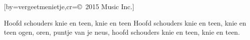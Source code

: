  

[by=vergeetmenietje,cr={\copyright~2015 Music Inc.}]




\beginverse
    Hoofd schouders knie en teen, knie en teen 
    Hoofd schouders knie en teen, knie en teen 
    ogen, oren, puntje van je neus, 
    hoofd schouders knie en teen, knie en teen. 
\endverse




\endsong
